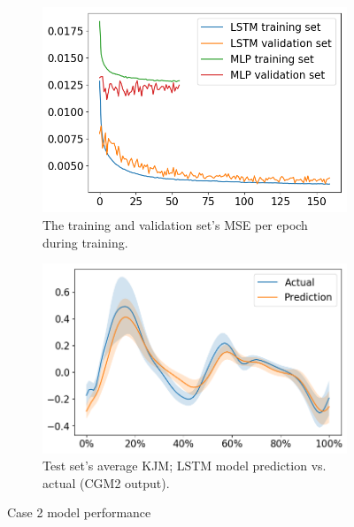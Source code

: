 \documentclass[../main.tex]{subfiles}
\begin{document}
\begin{figure}[!htb]
     \centering
     \begin{subfigure}[b]{0.475\textwidth}
         \centering
         \includegraphics[width=\textwidth]{img/results/training_history/Case2_LSTMvsMLP_training.png}
         \caption{The training and validation set's \ac{MSE} per epoch during training.}
         \label{fig:case2-training-performance}
     \end{subfigure}
     \hfill
     \begin{subfigure}[b]{0.515\textwidth}
         \centering
         \includegraphics[width=\textwidth]{img/results/test_prediction_evaluation/Case2_LSTM_test_prediction.png}
         \caption{Test set's average \ac{KJM}; LSTM model prediction vs. actual (CGM2 output).}
         \label{fig:case2-prediction-performance}
     \end{subfigure}
    \caption{Case 2 model performance}
    \label{fig:case2-performance-plots}
\end{figure}

\end{document}
